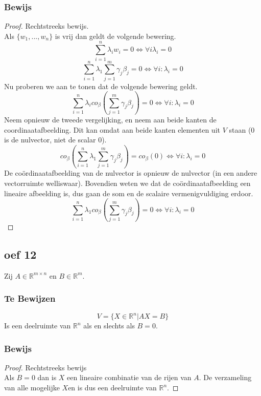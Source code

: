 \documentclass[lineaire_algebra_oplossingen.tex]{subfiles}
\begin{document}
\subsubsection*{Bewijs}
\begin{proof}
Rechtstreeks bewijs.\\
Als $\{w_1,...,w_n\}$ is vrij dan geldt de volgende bewering.
\[\sum_{i=1}^n\lambda_iw_i = 0 \Leftrightarrow \forall i \lambda_i = 0\]
\[
\sum_{i=1}^n \lambda_1\sum_{j=1}^m\gamma_j\beta_j = 0 \Leftrightarrow \forall i:\lambda_i=0
\]
Nu proberen we aan te tonen dat de volgende bewering geldt.
\[
\sum_{i=1}^n \lambda_i co_\beta\left(\sum_{j=1}^m\gamma_j\beta_j\right) = 0 \Leftrightarrow \forall i:\lambda_i=0
\]
Neem opnieuw de tweede vergelijking, en neem aan beide kanten de coordinaatafbeelding. Dit kan omdat aan beide kanten elementen uit $V$ staan ($0$ is de nulvector, niet de scalar $0$).
\[
co_{\beta}\left(\sum_{i=1}^n \lambda_1\sum_{j=1}^m\gamma_j\beta_j\right) = co_{\beta}(0) \Leftrightarrow \forall i:\lambda_i=0
\]
De co\"ordinaatafbeelding van de nulvector is opnieuw de nulvector (in een andere vectorruimte welliswaar). Bovendien weten we dat de co\"ordinaatafbeelding een lineaire afbeelding is, dus gaan de som en de scalaire vermenigvuldiging erdoor.
\[
\sum_{i=1}^n \lambda_1 co_{\beta}\left(\sum_{j=1}^m\gamma_j\beta_j\right) = 0 \Leftrightarrow \forall i:\lambda_i=0
\]
\end{proof}

\subsection{oef 12}
Zij $A \in \mathbb{R}^{m\times n}$ en $B \in \mathbb{R}^m$.
\subsubsection*{Te Bewijzen}
\[
V = \{ X \in \mathbb{R}^n | AX = B\}
\]
Is een deelruimte van $\mathbb{R}^n$ als en slechts als $B=0$.
\subsubsection*{Bewijs}
\begin{proof}
Rechtstreeks bewijs\\
Als $B=0$ dan is $X$ een lineaire combinatie van de rijen van $A$. De verzameling van alle mogelijke $X$en is dus een deelruimte van $\mathbb{R}^n$.
\end{proof}
\end{document}
